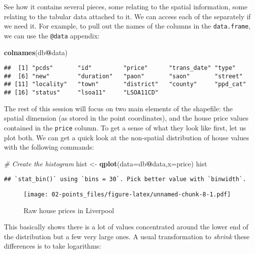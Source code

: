\documentclass[]{book}
\newenvironment{Shaded}{\begin{snugshade}}{\end{snugshade}}
\newcommand{\CommentTok}[1]{\textcolor[rgb]{0.56,0.35,0.01}{\textit{#1}}}
\newcommand{\DataTypeTok}[1]{\textcolor[rgb]{0.13,0.29,0.53}{#1}}
\newcommand{\KeywordTok}[1]{\textcolor[rgb]{0.13,0.29,0.53}{\textbf{#1}}}
\newcommand{\NormalTok}[1]{#1}
\newcommand{\OperatorTok}[1]{\textcolor[rgb]{0.81,0.36,0.00}{\textbf{#1}}}
\newcommand{\StringTok}[1]{\textcolor[rgb]{0.31,0.60,0.02}{#1}}
\begin{document}
See how it contains several pieces, some relating to the spatial information, some relating to the tabular data attached to it. We can access each of the separately if we need it. For example, to pull out the names of the columns in the \texttt{data.frame}, we can use the \texttt{@data} appendix:

\begin{Shaded}
\begin{Highlighting}[]
\KeywordTok{colnames}\NormalTok{(db}\OperatorTok{@}\NormalTok{data)}
\end{Highlighting}
\end{Shaded}

\begin{verbatim}
##  [1] "pcds"       "id"         "price"      "trans_date" "type"      
##  [6] "new"        "duration"   "paon"       "saon"       "street"    
## [11] "locality"   "town"       "district"   "county"     "ppd_cat"   
## [16] "status"     "lsoa11"     "LSOA11CD"
\end{verbatim}

The rest of this session will focus on two main elements of the shapefile: the spatial dimension (as stored in the point coordinates), and the house price values contained in the \texttt{price} column. To get a sense of what they look like first, let us plot both. We can get a quick look at the non-spatial distribution of house values with the following commands:

\begin{Shaded}
\begin{Highlighting}[]
\CommentTok{# Create the histogram}
\NormalTok{hist <-}\StringTok{ }\KeywordTok{qplot}\NormalTok{(}\DataTypeTok{data=}\NormalTok{db}\OperatorTok{@}\NormalTok{data,}\DataTypeTok{x=}\NormalTok{price)}
\NormalTok{hist}
\end{Highlighting}
\end{Shaded}

\begin{verbatim}
## `stat_bin()` using `bins = 30`. Pick better value with `binwidth`.
\end{verbatim}

\begin{figure}
\centering
\texttt{[image: 02-points\_files/figure-latex/unnamed-chunk-8-1.pdf]}
\caption{\label{fig:unnamed-chunk-8}Raw house prices in Liverpool}
\end{figure}

This basically shows there is a lot of values concentrated around the lower end of the distribution but a few very large ones. A usual transformation to \emph{shrink} these differences is to take logarithms:
\end{document}
